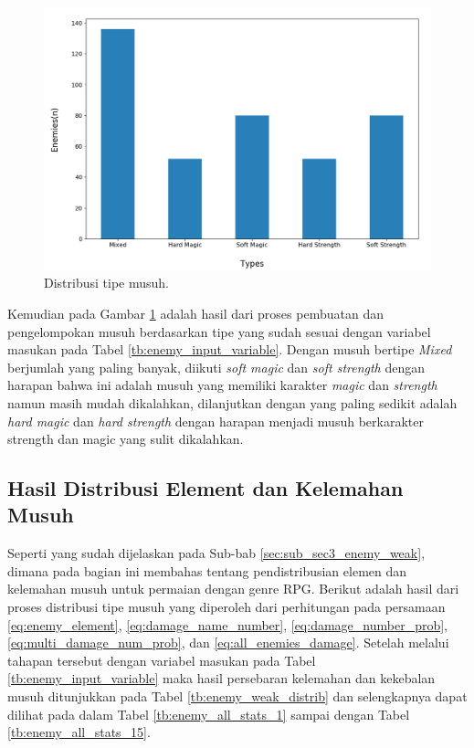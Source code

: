 \begin{figure} [!h] \centering
	\includegraphics[scale=0.5]{img/EnemyTypeDistrib.png}
	\caption{Distribusi tipe musuh.}
	\label{fig:enemy_type_distrib}
\end{figure}

Kemudian pada Gambar \ref{fig:enemy_type_distrib} adalah hasil dari proses pembuatan dan pengelompokan musuh berdasarkan tipe yang sudah sesuai dengan variabel masukan pada Tabel \ref{tb:enemy_input_variable}. Dengan musuh bertipe \textit{Mixed} berjumlah yang paling banyak, diikuti \textit{soft magic} dan \textit{soft strength} dengan harapan bahwa ini adalah musuh yang memiliki karakter \textit{magic} dan \textit{strength} namun masih mudah dikalahkan, dilanjutkan dengan yang paling sedikit adalah \textit{hard magic} dan \textit{hard strength} dengan harapan menjadi musuh berkarakter strength dan magic yang sulit dikalahkan.
\vspace{1ex}

\subsection{Hasil Distribusi Element dan Kelemahan Musuh}
\label{sec:sub_sec4_eval_dist_enemy_element_and_weak}
\vspace{1ex}

Seperti yang sudah dijelaskan pada Sub-bab \ref{sec:sub_sec3_enemy_weak}, dimana pada bagian ini membahas tentang pendistribusian elemen dan kelemahan musuh untuk permaian dengan genre RPG. Berikut adalah hasil dari proses distribusi tipe musuh yang diperoleh dari perhitungan pada persamaan \ref{eq:enemy_element}, \ref{eq:damage_name_number}, \ref{eq:damage_number_prob}, \ref{eq:multi_damage_num_prob}, dan \ref{eq:all_enemies_damage}. Setelah melalui tahapan tersebut dengan variabel masukan pada Tabel \ref{tb:enemy_input_variable} maka hasil persebaran kelemahan dan kekebalan musuh ditunjukkan pada Tabel \ref{tb:enemy_weak_distrib} dan selengkapnya dapat dilihat pada  dalam Tabel \ref{tb:enemy_all_stats_1} sampai dengan Tabel \ref{tb:enemy_all_stats_15}.
\vspace{-1ex}

